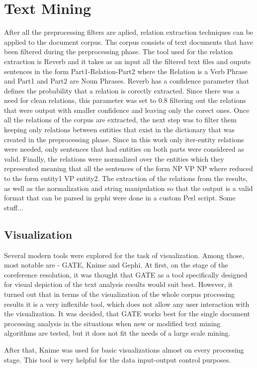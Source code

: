 \documentclass[]{article}
\begin{document}
\section{Text Mining}
%
After all the preprocessing filters are aplied, relation extraction techniques can be applied to the document corpus. The corpus consists of text documents that have been filtered during the preprocessing phase. The tool used for the relation extraction is Reverb and it takes as an input all the filtered text files and ouputs sentences in the form Part1-Relation-Part2 where the Relation is a Verb Phrase and Part1 and Part2 are Noun Phrases. Reverb has a confidence parameter that defines the probability that a relation is corectly extracted. Since there was a need for clean relations, this parameter was set to 0.8 filtering out the relations that were output with smaller confidence and leaving only the corect ones. Once all the relations of the corpus are extracted, the next step was to filter them keeping only relations between entities that exist in the dictionary that was created in the preprocessing phase. Since in this work only iter-entity relations were needed, only sentences that had entities on both parts were considered as valid. Finally, the relations were normalized over the entities which they represented meaning that all the sentences of the form NP VP NP where reduced to the form entity1 VP entity2.  The extraction of the relations from the results, as well as the normalization and string manipulation so that the output is a valid format that can be parsed in gephi were done in a custom Perl script.
Some stuff...
%
\subsection{Visualization}
%
Several modern tools were explored for the task of visualization. Among those, most notable are - GATE, Knime and Gephi. At first, on the stage of the coreference resolution, it was thought that GATE as a tool specifically designed for visual depiction of the text analysis results would suit best. However, it turned out that in terms of the visualization of the whole corpus processing results it is a very inflexible tool, which does not allow any user interaction with the visualization. It was decided, that GATE works best for the single document processing analysis in the situations when new or modified text mining algorithms are tested, but it does not fit the needs of a large scale mining.

After that, Knime was used for basic visualizations almost on every processing stage. This tool is very helpful for the data input-output control purposes.
\end{document}
